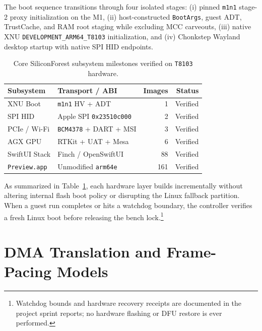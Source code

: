 \documentclass[10pt,twocolumn,letterpaper]{article}
\begin{document}
The boot sequence transitions through four isolated stages: (i) pinned \texttt{m1n1} stage-2 proxy initialization on the M1, (ii) host-constructed \texttt{BootArgs}, guest ADT, TrustCache, and RAM root staging while excluding MCC carveouts, (iii) native XNU \texttt{DEVELOPMENT\_ARM64\_T8103} initialization, and (iv) Chonkstep Wayland desktop startup with native SPI HID endpoints.

\begin{table}[h]
\centering
\caption{Core SiliconForest subsystem milestones verified on \texttt{T8103} hardware.}
\label{tab:milestones}
\scriptsize
\begin{tabular}{@{}llrr@{}}
\toprule
\textbf{\sffamily Subsystem} & \textbf{\sffamily Transport / ABI} & \textbf{\sffamily Images} & \textbf{\sffamily Status} \\
\midrule
XNU Boot & \texttt{m1n1} HV + ADT & 1 & Verified \\
SPI HID & Apple SPI \texttt{0x23510c000} & 2 & Verified \\
PCIe / Wi-Fi & \texttt{BCM4378} + DART + MSI & 3 & Verified \\
AGX GPU & RTKit + UAT + Mesa & 6 & Verified \\
SwiftUI Stack & Finch / OpenSwiftUI & 88 & Verified \\
\texttt{Preview.app} & Unmodified \texttt{arm64e} & 161 & Verified \\
\bottomrule
\end{tabular}
\end{table}

As summarized in Table~\ref{tab:milestones}, each hardware layer builds incrementally without altering internal flash boot policy or disrupting the Linux fallback partition. When a guest run completes or hits a watchdog boundary, the controller verifies a fresh Linux boot before releasing the bench lock.\footnote{Watchdog bounds and hardware recovery receipts are documented in the project sprint reports; no hardware flashing or DFU restore is ever performed.}

\section{DMA Translation and Frame-Pacing Models}
\label{sec:math}
\end{document}
